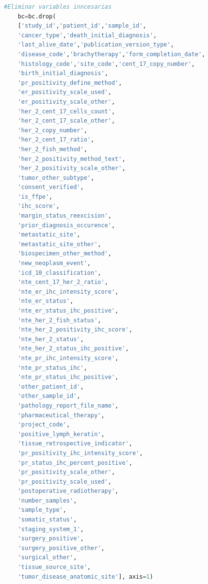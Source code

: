   \begin{lstlisting}[basicstyle=\tiny,language=Python, label=eliminacion, caption=Eliminar datos poco relvantes en Python.]
	#Eliminar variables inncesarias
	bc=bc.drop(
	['study_id','patient_id','sample_id',
	'cancer_type','death_initial_diagnosis',
	'last_alive_date','publication_version_type',
	'disease_code','brachytherapy','form_completion_date',
	'histology_code','site_code','cent_17_copy_number',
	'birth_initial_diagnosis',
	'pr_positivity_define_method',
	'er_positivity_scale_used',
	'er_positivity_scale_other',
	'her_2_cent_17_cells_count',
	'her_2_cent_17_scale_other',
	'her_2_copy_number',
	'her_2_cent_17_ratio',
	'her_2_fish_method',
	'her_2_positivity_method_text',
	'her_2_positivity_scale_other',
	'tumor_other_subtype',
	'consent_verified',
	'is_ffpe',
	'ihc_score',
	'margin_status_reexcision',
	'prior_diagnosis_occurence',
	'metastatic_site',
	'metastatic_site_other',
	'biospecimen_other_method',
	'new_neoplasm_event',
	'icd_10_classification',
	'nte_cent_17_her_2_ratio',
	'nte_er_ihc_intensity_score',
	'nte_er_status',
	'nte_er_status_ihc_positive',
	'nte_her_2_fish_status',
	'nte_her_2_positivity_ihc_score',
	'nte_her_2_status',
	'nte_her_2_status_ihc_positive',
	'nte_pr_ihc_intensity_score',
	'nte_pr_status_ihc',
	'nte_pr_status_ihc_positive',
	'other_patient_id',
	'other_sample_id',
	'pathology_report_file_name',
	'pharmaceutical_therapy',
	'project_code',
	'positive_lymph_keratin',
	'tissue_retrospective_indicator',
	'pr_positivity_ihc_intensity_score',
	'pr_status_ihc_percent_positive',
	'pr_positivity_scale_other',
	'pr_positivity_scale_used',
	'postoperative_radiotherapy',
	'number_samples',
	'sample_type',
	'somatic_status',
	'staging_system_1',
	'surgery_positive',
	'surgery_positive_other',
	'surgical_other',
	'tissue_source_site',
	'tumor_disease_anatomic_site'], axis=1)
 \end{lstlisting}

